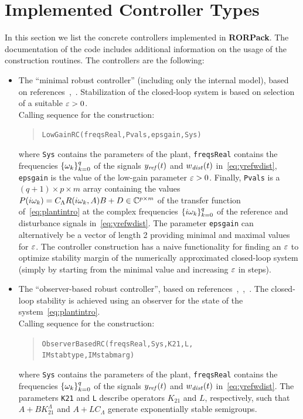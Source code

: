 \documentclass[11pt, a4paper]{amsart}
\newcommand{\CL}{C_\Lambda}
\theoremstyle{definition}
\numberwithin{equation}{section}
\newcommand{\yref}{y_{\mbox{\scriptsize\textit{ref}}}}
\newcommand{\wdist}{w_{\mbox{\scriptsize\textit{dist}}}}
\newcommand{\RORname}{\textbf{RORPack}}
\begin{document}
\section{Implemented Controller Types}
\label{sec:ControllerTypes}

In this section we list the concrete controllers implemented in \RORname.
The documentation of the code includes additional information on the usage of the construction routines.
The controllers are the following:
\begin{itemize}
  \item The ``minimal robust controller'' (including only the internal model), based on references~\cite{HamPoh00},~. Stabilization of the closed-loop system is based on selection of a suitable  $\varepsilon>0$.\\[1ex]
      Calling sequence for the construction:\\[-1ex]
     \begin{quotation}
       \texttt{LowGainRC(freqsReal,Pvals,epsgain,Sys)}
     \end{quotation}
     \medskip
     where \texttt{Sys} contains the parameters of the plant, \texttt{freqsReal} contains the frequencies $\{\omega_k\}_{k=0}^q$ of the signals $\yref(t)$ and $\wdist(t)$ in~\eqref{eq:yrefwdist}, \texttt{epsgain} is the value of the low-gain parameter $\varepsilon>0$. Finally, \texttt{Pvals} is a $(q+1)\times p\times m$ array containing the values $P(i\gw_k)=\CL R(i\gw_k,A)B+D\in \C^{p\times m}$ of the transfer function of~\eqref{eq:plantintro} at the complex frequencies $\{i\omega_k\}_{k=0}^q$ of the reference and disturbance signals in~\eqref{eq:yrefwdist}.
     The parameter \texttt{epsgain} can alternatively be a vector of length 2 providing minimal and maximal values for $\varepsilon$. The controller construction has a naive functionality for finding an $\varepsilon$ to optimize stability margin of the numerically approximated closed-loop system (simply by starting from the minimal value and increasing $\varepsilon$ in steps). 

     \bigskip

  \item The ``observer-based robust controller'', based on references~,~,~. The closed-loop stability is achieved using an observer for the state of the system~\eqref{eq:plantintro}.\\[1ex]
      Calling sequence for the construction:\\[-1ex]
     \begin{quotation}
       \texttt{ObserverBasedRC(freqsReal,Sys,K21,L,\\ 
	 \phantom{a}\hspace{2.7cm} IMstabtype,IMstabmarg)}
     \end{quotation}
     \medskip
     where \texttt{Sys} contains the parameters of the plant, \texttt{freqsReal} contains the frequencies $\{\omega_k\}_{k=0}^q$ of the signals $\yref(t)$ and $\wdist(t)$ in~\eqref{eq:yrefwdist}.
     The parameters \texttt{K21} and \texttt{L} describe operators $K_{21}$ and $L$, respectively, such that $A+BK_{21}^\Lambda$ and $A+L\CL$ generate exponentially stable semigroups. 


\end{itemize}
\end{document}
